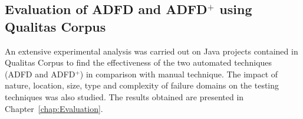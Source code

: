 




\subsection{Evaluation of ADFD and ADFD$^+$ using Qualitas Corpus}

An extensive experimental analysis was carried out on Java projects contained in Qualitas Corpus to find the effectiveness of the two automated techniques (ADFD and ADFD$^+$) in comparison with manual technique. The impact of nature, location, size, type and complexity of failure domains on the testing techniques was also studied. The results obtained are presented in Chapter~\ref{chap:Evaluation}.








